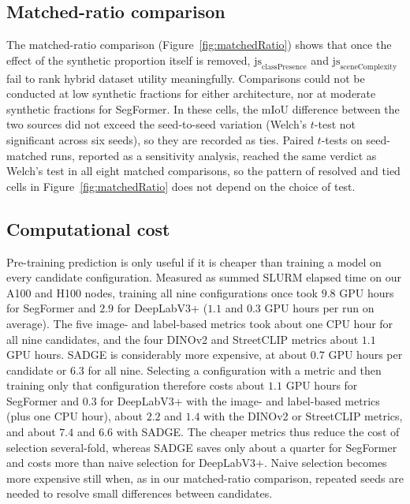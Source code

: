 \documentclass[conference]{IEEEtran}
\begin{document}
\subsection{Matched-ratio comparison}
The matched-ratio comparison (Figure~\ref{fig:matchedRatio}) shows that once the effect of the synthetic proportion itself is removed,   $\text{js}_\text{classPresence}$ and $\text{js}_{\text{sceneComplexity}}$ fail to rank hybrid dataset utility meaningfully. Comparisons could not be conducted at low synthetic fractions for either architecture, nor at moderate synthetic fractions for SegFormer. In these cells, the mIoU difference between the two sources did not exceed the seed-to-seed variation (Welch's $t$-test not significant across six seeds), so they are recorded as ties. Paired $t$-tests on seed-matched runs, reported as a sensitivity analysis, reached the same verdict as Welch's test in all eight matched comparisons, so the pattern of resolved and tied cells in Figure~\ref{fig:matchedRatio} does not depend on the choice of test.

\subsection{Computational cost}
Pre-training prediction is only useful if it is cheaper than training a model on every candidate configuration. Measured as summed SLURM elapsed time on our A100 and H100 nodes, training all nine configurations once took $9.8$ GPU hours for SegFormer and $2.9$ for DeepLabV3+ ($1.1$ and $0.3$ GPU hours per run on average). The five image- and label-based metrics took about one CPU hour for all nine candidates, and the four DINOv2 and StreetCLIP metrics about $1.1$ GPU hours. SADGE is considerably more expensive, at about $0.7$ GPU hours per candidate or $6.3$ for all nine. Selecting a configuration with a metric and then training only that configuration therefore costs about $1.1$ GPU hours for SegFormer and $0.3$ for DeepLabV3+ with the image- and label-based metrics (plus one CPU hour), about $2.2$ and $1.4$ with the DINOv2 or StreetCLIP metrics, and about $7.4$ and $6.6$ with SADGE. The cheaper metrics thus reduce the cost of selection several-fold, whereas SADGE saves only about a quarter for SegFormer and costs more than naive selection for DeepLabV3+. Naive selection becomes more expensive still when, as in our matched-ratio comparison, repeated seeds are needed to resolve small differences between candidates.
\end{document}
